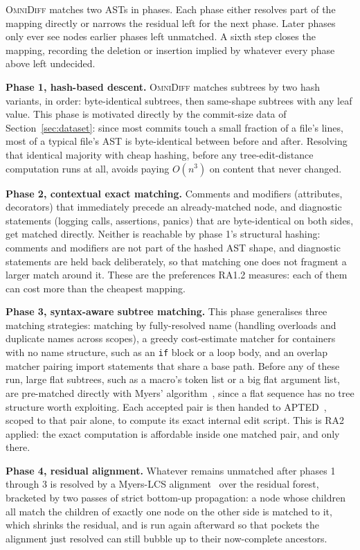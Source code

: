 \documentclass[sigconf]{acmart}
\begin{document}
\textsc{OmniDiff} matches two ASTs in \NumPhasesWord{} phases. Each phase either resolves part of the
mapping directly or narrows the residual left for the next phase. Later phases only ever see
nodes earlier phases left unmatched. A sixth step closes the mapping, recording the deletion or
insertion implied by whatever every phase above left undecided.

\textbf{Phase 1, hash-based descent.} \textsc{OmniDiff} matches subtrees by two hash variants, in
order: byte-identical subtrees, then same-shape subtrees with any leaf value. This phase is
motivated directly
by the commit-size data of Section~\ref{sec:dataset}: since most commits touch a small fraction of
a file's lines, most of a typical file's AST is byte-identical between before and after. Resolving
that identical majority with cheap hashing, before any tree-edit-distance computation runs at all,
avoids paying $O(n^3)$ on content that never changed.

\textbf{Phase 2, contextual exact matching.} Comments and modifiers (attributes, decorators) that
immediately precede an already-matched node, and diagnostic statements (logging calls, assertions,
panics) that are byte-identical on both sides, get matched directly. Neither is reachable by phase 1's structural hashing: comments and modifiers are not part of the hashed AST
shape, and diagnostic statements are held back deliberately, so that matching one does not
fragment a larger match around it. These are the preferences RA1.2 measures: each of them can
cost more than the cheapest mapping.

\textbf{Phase 3, syntax-aware subtree matching.} This phase generalises three matching strategies:
matching by fully-resolved name (handling overloads and duplicate names across
scopes), a greedy cost-estimate matcher for containers with no name structure, such as an
\texttt{if} block or a loop body, and an overlap matcher pairing import statements that share a
base path. Before any of these run, large flat subtrees, such as a macro's token list or a big
flat argument list, are pre-matched directly with Myers' algorithm~\cite{myers-1986}, since a flat sequence has no tree structure worth exploiting. Each accepted pair is then handed to
APTED~\cite{apted-2015}, scoped to that pair alone, to compute its exact internal edit script.
This is RA2 applied: the exact computation is affordable inside one matched pair, and only there.

\textbf{Phase 4, residual alignment.} Whatever remains unmatched after phases 1 through 3 is
resolved by a Myers-LCS alignment~\cite{myers-1986} over the residual forest, bracketed by two
passes of strict bottom-up propagation: a node whose children all match the children of exactly
one node on the other side is matched to it, which shrinks the residual, and is run again afterward so that pockets the alignment just resolved can still bubble up to
their now-complete ancestors.
\end{document}
